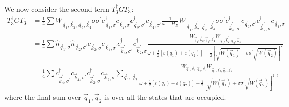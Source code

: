 \documentclass{revtex4-2}
\begin{document}
We now consider the second term \(T_3^\dagger G T_3\):
\begin{equation}\begin{aligned}
	T_3^\dagger G T_3 &= \frac{1}{4}\sum W_{\vec q_1,\vec k_2, \vec q_2, \vec k_4} \sigma\sigma^\prime c^\dagger_{\vec q_1,\sigma}c_{\vec k_2,\sigma}c^\dagger_{\vec q_2,\sigma^\prime}c_{\vec k_4,\sigma^\prime} \frac{1}{\omega - H_D} W_{\vec q_1,\vec k_2^\prime, \vec q_2, \vec k_4^\prime} \sigma\sigma^\prime c^\dagger_{\vec k^\prime_4,\sigma^\prime} c_{\vec q_2,\sigma^\prime} c^\dagger_{\vec k^\prime_2,\sigma} c_{\vec q_1,\sigma}\\
			  &= \frac{1}{4}\sum  \hat n_{\vec q_1,\sigma} \hat n_{\vec q_2,\sigma^\prime} c_{\vec k_2,\sigma} c_{\vec k_4,\sigma^\prime} c^\dagger_{\vec k^\prime_4,\sigma^\prime} c^\dagger_{\vec k^\prime_2,\sigma} \frac{W_{\vec q_1,\vec k_2, \vec q_2, \vec k_4} W_{\vec q_1,\vec k_2^\prime, \vec q_2, \vec k_4^\prime}}{\omega + \frac{1}{2}\left[\varepsilon(q_1) + \varepsilon(q_2)\right] + \frac{1}{2}\left[\sqrt{W\left(\vec q_1\right)} + \sigma\sigma^\prime\sqrt{W\left(\vec q_2\right)}\right]^2}\\
			  &= \frac{1}{4}\sum c^\dagger_{\vec k^\prime_4,\sigma^\prime} c_{\vec k_4,\sigma^\prime} c^\dagger_{\vec k^\prime_2,\sigma}c_{\vec k_2,\sigma}  \sum_{\vec q_1, \vec q_2}\frac{W_{\vec q_1,\vec k_2, \vec q_2, \vec k_4} W_{\vec q_1,\vec k_2^\prime, \vec q_2, \vec k_4^\prime}}{\omega + \frac{1}{2}\left[\varepsilon(q_1) + \varepsilon(q_2)\right] + \frac{1}{2}\left[\sqrt{W\left(\vec q_1\right)} + \sigma\sigma^\prime\sqrt{W\left(\vec q_2\right)}\right]^2}~,
\end{aligned}\end{equation}
where the final sum over \(\vec q_1, \vec q_2\) is over all the states that are occupied.
\end{document}
